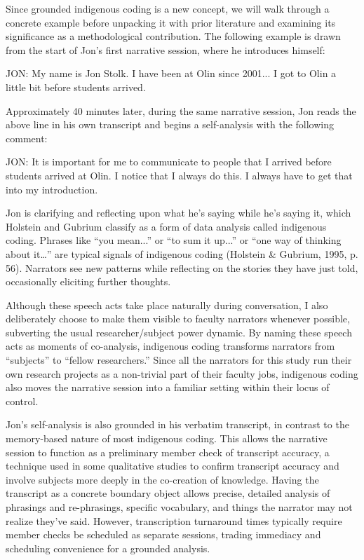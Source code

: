Since grounded indigenous coding is a new concept, we will walk through a concrete example before unpacking it with prior literature and examining its significance as a methodological contribution. The following example is drawn from the start of Jon’s first narrative session, where he introduces himself:

JON: My name is Jon Stolk. I have been at Olin since 2001... I got to Olin a little bit before students arrived.

Approximately 40 minutes later, during the same narrative session, Jon reads the above line in his own transcript and begins a self-analysis with the following comment:

JON: It is important for me to communicate to people that I arrived before students arrived at Olin. I notice that I always do this. I always have to get that into my introduction.

Jon is clarifying and reflecting upon what he’s saying while he’s saying it, which Holstein and Gubrium classify as a form of data analysis called indigenous coding. Phrases like “you mean...” or “to sum it up...” or “one way of thinking about it…” are typical signals of indigenous coding (Holstein & Gubrium, 1995, p. 56). Narrators see new patterns while reflecting on the stories they have just told, occasionally eliciting further thoughts.

Although these speech acts take place naturally during conversation, I also deliberately choose to make them visible to faculty narrators whenever possible, subverting the usual researcher/subject power dynamic. By naming these speech acts as moments of co-analysis, indigenous coding transforms narrators from “subjects” to “fellow researchers.” Since all the narrators for this study run their own research projects as a non-trivial part of their faculty jobs, indigenous coding also moves the narrative session into a familiar setting within their locus of control.

Jon’s self-analysis is also grounded in his verbatim transcript, in contrast to the memory-based nature of most indigenous coding. This allows the narrative session to function as a preliminary member check of transcript accuracy, a technique used in some qualitative studies to confirm transcript accuracy and involve subjects more deeply in the co-creation of knowledge. Having the transcript as a concrete boundary object allows precise, detailed analysis of phrasings and re-phrasings, specific vocabulary, and things the narrator may not realize they’ve said. However, transcription turnaround times typically require member checks be scheduled as separate sessions, trading immediacy and scheduling convenience for a grounded analysis.

